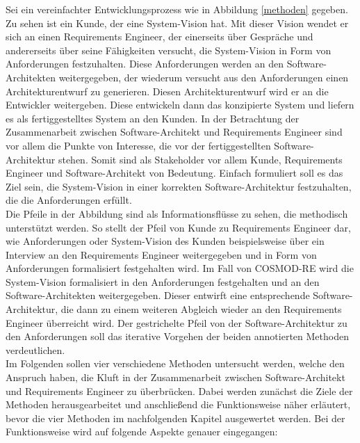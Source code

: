 Sei ein vereinfachter Entwicklungsprozess wie in Abbildung \ref{methoden} gegeben. Zu sehen ist ein Kunde, der eine System-Vision hat. Mit dieser Vision wendet er sich an einen Requirements Engineer, der einerseits \"uber Gespr\"ache und andererseits \"uber seine F\"ahigkeiten versucht, die System-Vision in Form von Anforderungen festzuhalten. Diese Anforderungen werden an den Software-Architekten weitergegeben, der wiederum versucht aus den Anforderungen einen Architekturentwurf zu generieren. Diesen Architekturentwurf wird er an die Entwickler weitergeben. Diese entwickeln dann das konzipierte System und liefern es als fertiggestelltes System an den Kunden. In der Betrachtung der Zusammenarbeit zwischen Software-Architekt und Requirements Engineer sind vor allem die Punkte von Interesse, die vor der fertiggestellten Software-Architektur stehen. Somit sind als Stakeholder vor allem Kunde, Requirements Engineer und Software-Architekt von Bedeutung. Einfach formuliert soll es das Ziel sein, die System-Vision in einer korrekten Software-Architektur festzuhalten, die die Anforderungen erf\"ullt.\\

Die Pfeile in der Abbildung sind als Informationsfl\"usse zu sehen, die methodisch unterst\"utzt werden. So stellt der Pfeil von Kunde zu Requirements Engineer dar, wie Anforderungen oder System-Vision des Kunden beispielsweise \"uber ein Interview an den Requirements Engineer weitergegeben und in Form von Anforderungen formalisiert festgehalten wird. Im Fall von COSMOD-RE wird die System-Vision formalisiert in den Anforderungen festgehalten und an den Software-Architekten weitergegeben. Dieser entwirft eine entsprechende Software-Architektur, die dann zu einem weiteren Abgleich wieder an den Requirements Engineer \"uberreicht wird. Der gestrichelte Pfeil von der Software-Architektur zu den Anforderungen soll das iterative Vorgehen der beiden annotierten Methoden verdeutlichen.\\

Im Folgenden sollen vier verschiedene Methoden untersucht werden, welche den Anspruch haben, die Kluft in der Zusammenarbeit zwischen Software-Architekt und Requirements Engineer zu \"uberbr\"ucken. Dabei werden zun\"achst die Ziele der Methoden herausgearbeitet und anschlie\ss{}end die Funktionsweise n\"aher erl\"autert, bevor die vier Methoden im nachfolgenden Kapitel ausgewertet werden. Bei der Funktionsweise wird auf folgende Aspekte genauer eingegangen: \\


